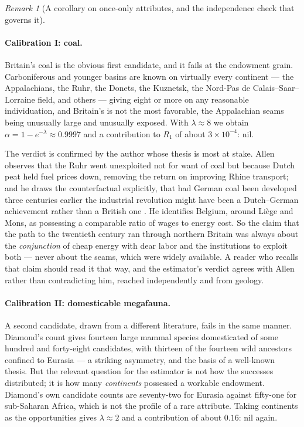 \documentclass[11pt]{article}
\numberwithin{equation}{section}
\theoremstyle{plain}
\theoremstyle{definition}
\theoremstyle{remark}
\newtheorem{remark}[theorem]{Remark}
\begin{document}
\begin{remark}[A corollary on once-only attributes, and the independence
check that governs it]
\paragraph{Calibration I: coal.} Britain's coal is the obvious first
candidate, and it fails at the endowment grain. Carboniferous and
younger basins are known on virtually every continent --- the
Appalachians, the Ruhr, the Donets, the Kuznetsk, the Nord-Pas de
Calais--Saar--Lorraine field, and others --- giving eight or more on any
reasonable individuation, and Britain's is not the most favorable, the
Appalachian seams being unusually large and unusually exposed. With
$\lambda\approx8$ we obtain $\alpha=1-e^{-\lambda}\approx0.9997$ and a
contribution to $R_1$ of about $3\times10^{-4}$: nil.

The verdict is confirmed by the author whose thesis is most at stake.
Allen observes that the Ruhr went unexploited not for want of coal but
because Dutch peat held fuel prices down, removing the return on
improving Rhine transport; and he draws the counterfactual explicitly,
that had German coal been developed three centuries earlier the
industrial revolution might have been a Dutch--German achievement rather
than a British one \cite{Allen09}. He identifies Belgium, around
Li\`ege and Mons, as possessing a comparable ratio of wages to energy
cost. So the claim that the path to the twentieth century ran through
northern Britain was always about the \emph{conjunction} of cheap energy
with dear labor and the institutions to exploit both --- never about
the seams, which were widely available. A reader who recalls that claim
should read it that way, and the estimator's verdict agrees with Allen
rather than contradicting him, reached independently and from geology.

\paragraph{Calibration II: domesticable megafauna.} A second candidate,
drawn from a different literature, fails in the same manner. Diamond's
count gives fourteen large mammal species domesticated of some hundred
and forty-eight candidates, with thirteen of the fourteen wild ancestors
confined to Eurasia \cite{Diamond97} --- a striking asymmetry, and the
basis of a well-known thesis. But the relevant question for the
estimator is not how the successes distributed; it is how many
\emph{continents} possessed a workable endowment. Diamond's own
candidate counts are seventy-two for Eurasia against fifty-one for
sub-Saharan Africa, which is not the profile of a rare attribute. Taking
continents as the opportunities gives $\lambda\approx2$ and a
contribution of about $0.16$: nil again.


\end{remark}
\end{document}
